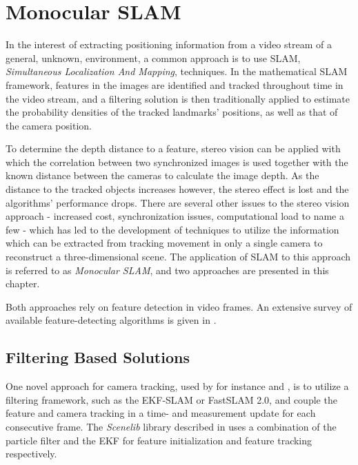 \chapter{Monocular SLAM}
\label{cha:monoslam}
    In the interest of extracting positioning information from a video stream
    of a general, unknown, environment, a common approach is to use SLAM,
    \textit{Simultaneous Localization And Mapping}, techniques.
    In the mathematical SLAM framework, features in the images are identified
    and tracked throughout time in the video stream, and a filtering solution
    is then traditionally applied to estimate the probability densities
    of the tracked landmarks' positions, as well as that of the camera position.

    To determine the depth distance to a feature, stereo vision can be applied
    with which the correlation between two synchronized images is used together with the known
    distance between the cameras to calculate the image depth.
    As the distance to the tracked objects increases however, the stereo
    effect is lost and the algorithms' performance drops.
    There are several other issues to the stereo vision approach - increased
    cost, synchronization issues, computational load to name a few - which has
    led to the development of techniques to utilize the information which can be extracted
    from tracking movement in only a single camera to reconstruct a three-dimensional scene.
    The application of SLAM to this approach is referred to as \textit{Monocular SLAM},
    and two approaches are presented in this chapter.

    Both approaches rely on feature detection in video frames.
    An extensive survey of available feature-detecting algorithms
    is given in \citep{idris09reviewoffeaturedetection}.

    \section{Filtering Based Solutions}
        \label{sec:video:filtersolutions}
        One novel approach for camera tracking, used by for instance \citep{DBLP:conf/iccv/Davison03} and \citep{Eade:2006:SMS:1153170.1153506},
        is to utilize a filtering framework, such as the EKF-SLAM or FastSLAM 2.0,
        and couple the feature and camera tracking in a time- and measurement
        update for each consecutive frame.
        The \textit{Scenelib} library described in \citep{DBLP:conf/iccv/Davison03}
        uses a combination of the particle filter and the EKF for feature initialization
        and feature tracking respectively.

